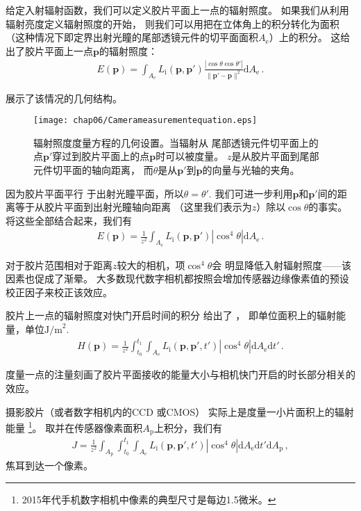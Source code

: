 给定入射辐射函数，我们可以定义胶片平面上一点的辐射照度。
如果我们从利用辐射亮度定义辐射照度的开始，
则我们可以用把在立体角上的积分转化为面积
（这种情况下即定界出射光瞳的尾部透镜元件的切平面面积$A_{\mathrm{e}}$）上的积分。
这给出了胶片平面上一点$\bm p$的辐射照度：
\begin{align*}
    E({\bm p})=\int_{A_{\mathrm{e}}}{L_{\mathrm{i}}({\bm p},{\bm p}')
    \frac{|\cos\theta\cos\theta'|}{\|{\bm p}'-{\bm p}\|^2}\mathrm{d}A_{\mathrm{e}}}\, .
\end{align*}

展示了该情况的几何结构。
\begin{figure}[htbp]
    \centering\texttt{[image: chap06/Camerameasurementequation.eps]}
    \caption{辐射照度度量方程的几何设置。当辐射从
        尾部透镜元件切平面上的点$\bm p'$穿过到胶片平面上的点$\bm p$时可以被度量。
        $z$是从胶片平面到尾部元件切平面的轴向距离，
        而$\theta$是从$\bm p'$到$\bm p$的向量与光轴的夹角。}
    \label{fig:6.25}
\end{figure}

因为胶片平面平行
于出射光瞳平面，所以$\theta=\theta'$.
我们可进一步利用$\bm p$和$\bm p'$间的距离等于从胶片平面到出射光瞳轴向距离
（这里我们表示为$z$）除以$\cos\theta$的事实。
将这些全部结合起来，我们有
\begin{align}\label{eq:6.5}
    E({\bm p})=\frac{1}{z^2}\int_{A_{\mathrm{e}}}{L_{\mathrm{i}}({\bm p},{\bm p}')|\cos^4\theta|\mathrm{d}A_{\mathrm{e}}}\, .
\end{align}

对于胶片范围相对于距离$z$较大的相机，项$\cos^4\theta$会
明显降低入射辐射照度——该因素也促成了渐晕。
大多数现代数字相机都按照会增加传感器边缘像素值的预设校正因子来校正该效应。

胶片上一点的辐射照度对快门开启时间的积分
给出了
，
即单位面积上的辐射能量，单位$\text{J/m}^2$.
\begin{align}\label{eq:6.6}
    H({\bm p})=\frac{1}{z^2}\int_{t_0}^{t_1}\int_{A_{\mathrm{e}}}
    L_{\mathrm{i}}({\bm p},{\bm p}',t')|\cos^4\theta|\mathrm{d}A_{\mathrm{e}}\mathrm{d}t'\, .
\end{align}

度量一点的注量刻画了胶片平面接收的能量大小与相机快门开启的时长部分相关的效应。

摄影胶片（或者数字相机内的CCD
或CMOS）
实际上是度量一小片面积上的辐射能量
\footnote{2015年代手机数字相机中像素的典型尺寸是每边1.5微米。}。
取并在传感器像素面积$A_{\mathrm{p}}$上积分，我们有
\begin{align}\label{eq:6.7}
    J=\frac{1}{z^2}\int_{A_{\mathrm{p}}}\int_{t_0}^{t_1}\int_{A_{\mathrm{e}}}
    L_{\mathrm{i}}({\bm p},{\bm p}',t')|\cos^4\theta|\mathrm{d}A_{\mathrm{e}}\mathrm{d}t'\mathrm{d}A_{\mathrm{p}}\, ,
\end{align}
焦耳到达一个像素。

